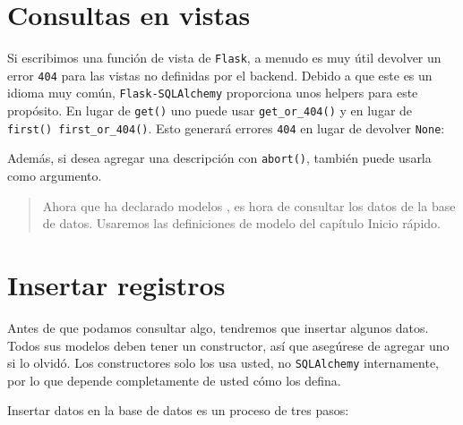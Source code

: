 \documentclass[11pt,letterpaper,notumble]{leaflet}
\begin{document}
{\begin{minipage}{2.2\linewidth}
			\section{Consultas en vistas}
			
			Si escribimos una función de vista de \texttt{Flask}, a menudo es muy útil devolver un error \texttt{404} para las vistas no definidas por el backend. Debido a que este es un idioma muy común, \texttt{Flask-SQLAlchemy} proporciona unos helpers para este propósito. En lugar de \texttt{get()} uno puede usar \texttt{get\_or\_404()} y en lugar de \texttt{first() first\_or\_404()}. Esto generará errores \texttt{404} en lugar de devolver \texttt{None}:
	
			
			
			Además, si desea agregar una descripción con \texttt{abort()}, también puede usarla como argumento.
			
				
		\end{minipage}
		
	}
	\clearpage %
	\mbox{}
	\clearpage
	
	\mbox{}
	
	\clearpage %
	
	\maketitle
	\begin{abstract}
		Ahora que ha declarado modelos , es hora de consultar los datos de la base de datos. Usaremos las definiciones de modelo del capítulo Inicio rápido.
	\end{abstract}

    \section{Insertar registros}
    
    Antes de que podamos consultar algo, tendremos que insertar algunos datos. Todos sus modelos deben tener un constructor, así que asegúrese de agregar uno si lo olvidó. Los constructores solo los usa usted, no \texttt{SQLAlchemy} internamente, por lo que depende completamente de usted cómo los defina.
    
    Insertar datos en la base de datos es un proceso de tres pasos:
    
\end{document}
